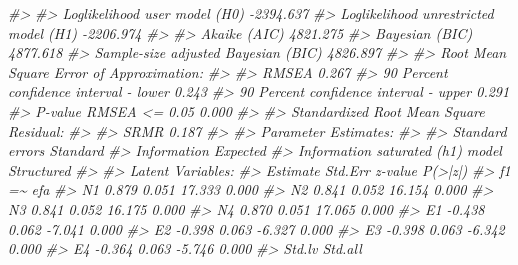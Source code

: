 \documentclass[
  11pt,
]{krantz}
\makeatletter
\newenvironment{Shaded}{\begin{snugshade}}{\end{snugshade}}
\newcommand{\CommentTok}[1]{\textcolor[rgb]{0.37,0.37,0.37}{\textit{#1}}}
\newenvironment{kframe}{%
\medskip{}
\setlength{\fboxsep}{.8em}
 \def\at@end@of@kframe{}%
 \ifinner\ifhmode%
  \def\at@end@of@kframe{\end{minipage}}%
  \begin{minipage}{\columnwidth}%
 \fi\fi%
 \def\FrameCommand##1{\hskip\@totalleftmargin \hskip-\fboxsep
 \colorbox{shadecolor}{##1}\hskip-\fboxsep
     \hskip-\linewidth \hskip-\@totalleftmargin \hskip\columnwidth}%
 \MakeFramed {\advance\hsize-\width
   \@totalleftmargin\z@ \linewidth\hsize
   \@setminipage}}%
 {\par\unskip\endMakeFramed%
 \at@end@of@kframe}
\renewenvironment{Shaded}{\begin{kframe}}{\end{kframe}}
\theoremstyle{definition}
\theoremstyle{definition}
\theoremstyle{definition}
\theoremstyle{definition}
\theoremstyle{remark}
\makeatother
\begin{document}
\begin{Shaded}
\begin{Highlighting}[]
\CommentTok{\#\textgreater{} }
\CommentTok{\#\textgreater{}   Loglikelihood user model (H0)              {-}2394.637}
\CommentTok{\#\textgreater{}   Loglikelihood unrestricted model (H1)      {-}2206.974}
\CommentTok{\#\textgreater{}                                                       }
\CommentTok{\#\textgreater{}   Akaike (AIC)                                4821.275}
\CommentTok{\#\textgreater{}   Bayesian (BIC)                              4877.618}
\CommentTok{\#\textgreater{}   Sample{-}size adjusted Bayesian (BIC)         4826.897}
\CommentTok{\#\textgreater{} }
\CommentTok{\#\textgreater{} Root Mean Square Error of Approximation:}
\CommentTok{\#\textgreater{} }
\CommentTok{\#\textgreater{}   RMSEA                                          0.267}
\CommentTok{\#\textgreater{}   90 Percent confidence interval {-} lower         0.243}
\CommentTok{\#\textgreater{}   90 Percent confidence interval {-} upper         0.291}
\CommentTok{\#\textgreater{}   P{-}value RMSEA \textless{}= 0.05                          0.000}
\CommentTok{\#\textgreater{} }
\CommentTok{\#\textgreater{} Standardized Root Mean Square Residual:}
\CommentTok{\#\textgreater{} }
\CommentTok{\#\textgreater{}   SRMR                                           0.187}
\CommentTok{\#\textgreater{} }
\CommentTok{\#\textgreater{} Parameter Estimates:}
\CommentTok{\#\textgreater{} }
\CommentTok{\#\textgreater{}   Standard errors                             Standard}
\CommentTok{\#\textgreater{}   Information                                 Expected}
\CommentTok{\#\textgreater{}   Information saturated (h1) model          Structured}
\CommentTok{\#\textgreater{} }
\CommentTok{\#\textgreater{} Latent Variables:}
\CommentTok{\#\textgreater{}                    Estimate  Std.Err  z{-}value  P(\textgreater{}|z|)}
\CommentTok{\#\textgreater{}   f1 =\textasciitilde{} efa                                           }
\CommentTok{\#\textgreater{}     N1                0.879    0.051   17.333    0.000}
\CommentTok{\#\textgreater{}     N2                0.841    0.052   16.154    0.000}
\CommentTok{\#\textgreater{}     N3                0.841    0.052   16.175    0.000}
\CommentTok{\#\textgreater{}     N4                0.870    0.051   17.065    0.000}
\CommentTok{\#\textgreater{}     E1               {-}0.438    0.062   {-}7.041    0.000}
\CommentTok{\#\textgreater{}     E2               {-}0.398    0.063   {-}6.327    0.000}
\CommentTok{\#\textgreater{}     E3               {-}0.398    0.063   {-}6.342    0.000}
\CommentTok{\#\textgreater{}     E4               {-}0.364    0.063   {-}5.746    0.000}
\CommentTok{\#\textgreater{}    Std.lv  Std.all}

\end{Highlighting}
\end{Shaded}
\end{document}
